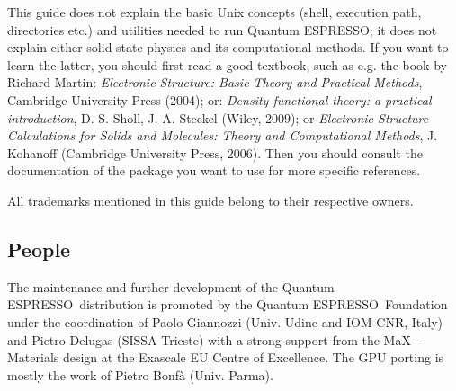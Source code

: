 \documentclass[12pt,a4paper]{article}
\def\qe{{\sc Quantum ESPRESSO}}
\begin{document}
This guide does not explain the basic Unix concepts (shell, execution
path, directories etc.) and utilities needed to run \qe; it does not
explain either solid state physics and its computational methods.
If you want to learn the latter, you should first read a good textbook,
such as e.g. the book by Richard Martin:
{\em Electronic Structure: Basic Theory and Practical Methods},
Cambridge University Press (2004); or:
{\em Density functional theory: a practical introduction},
D. S. Sholl, J. A. Steckel (Wiley, 2009); or
{\em Electronic Structure Calculations for Solids and Molecules:
Theory and Computational Methods},
J. Kohanoff (Cambridge University Press, 2006). Then you should consult
the documentation of the package you want to use for more specific references.

All trademarks mentioned in this guide belong to their respective owners.

\subsection{People}

The maintenance and further development of the \qe\ distribution
is promoted by the \qe\ Foundation under the coordination of
Paolo Giannozzi (Univ. Udine and IOM-CNR, Italy) and Pietro Delugas
(SISSA Trieste) with a strong support from the MaX - Materials design
at the Exascale EU Centre of Excellence. The GPU porting is mostly the
work of Pietro Bonf\`a (Univ. Parma).
\end{document}
